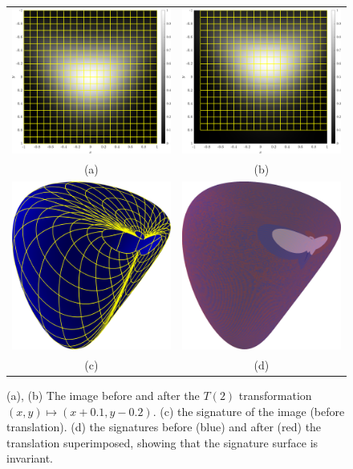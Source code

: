 \documentclass[review,onefignum,onetabnum]{siamonline190516}
\begin{document}
\begin{figure}
  \centering
  \begin{tabular}{cc}
  \includegraphics[width=.45\textwidth]{Figs/function_scanlines} &
  \includegraphics[width=.45\textwidth]{Figs/f_transformed_T2} \\
  (a) & (b) \\
  \includegraphics[width=.45\textwidth]{Figs/T2_signature} &
  \includegraphics[width=.45\textwidth]{Figs/T2_match} \\
  (c) & (d)
  \end{tabular}
  \caption{(a), (b) The image before and after the $T(2)$ transformation $(x,
  y) \mapsto (x + 0.1, y - 0.2)$. (c) the signature of the
  image (before translation). (d) the signatures before (blue) and after (red)
  the translation superimposed, showing that the signature surface is invariant.}\label{fig:T2}
\end{figure}
\end{document}

